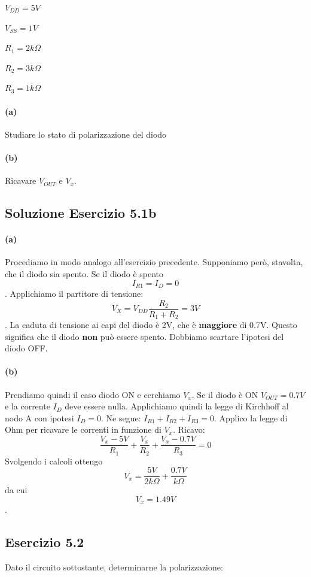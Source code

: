 \documentclass[\main/main.tex]{subfiles}
\begin{document}
\begin{center}
  $V_{DD}=5V$

  $V_{SS}=1V$

  $R_1=2k\Omega$

  $R_2=3k\Omega$

  $R_3=1k\Omega$

\end{center}

\paragraph{(a)} Studiare lo stato di polarizzazione del diodo \paragraph{(b)} Ricavare $V_{OUT}$ e $V_x$.

\subsection{Soluzione Esercizio 5.1b}
\paragraph{(a)}
Procediamo in modo analogo all'esercizio precedente.
Supponiamo però, stavolta, che il diodo sia spento.
Se il diodo è spento \[I_{R1}=I_D=0\].
Applichiamo il partitore di tensione:
\[V_{X} = V_{DD}\frac{R_2}{R_1+R_2} = 3V\].
La caduta di tensione ai capi del diodo è 2V, che è \textbf{maggiore} di 0.7V.
Questo significa che il diodo \textbf{non} può essere spento.
Dobbiamo scartare l'ipotesi del diodo OFF.

\paragraph{(b)}
Prendiamo quindi il caso diodo ON e cerchiamo $V_x$.
Se il diodo è ON $V_{OUT}=0.7V$ e la corrente $I_D$ deve essere nulla.
Applichiamo quindi la legge di Kirchhoff al nodo A con ipotesi $I_D=0$. Ne segue: $I_{R1}+I_{R2}+I_{R3}=0$.
Applico la legge di Ohm per ricavare le correnti in funzione di $V_x$.
Ricavo:
\[\frac{V_x-5V}{R_1} + \frac{V_x}{R_2} + \frac{V_x-0.7V}{R_3} =0 \]
Svolgendo i calcoli ottengo \[V_x = \frac{5V}{2k\Omega} + \frac{0.7V}{k\Omega} \]
da cui \[V_x=1.49V\].

\subsection{Esercizio 5.2}
Dato il circuito sottostante, determinarne la polarizzazione:
\end{document}

